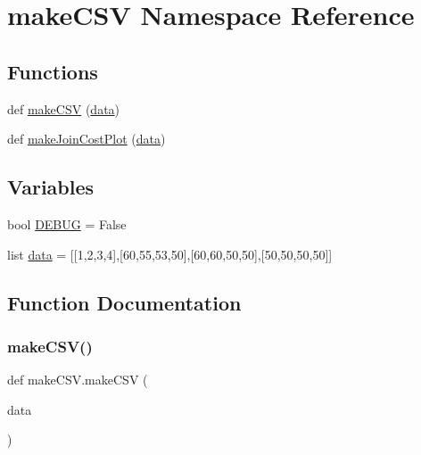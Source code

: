 \hypertarget{namespacemake_c_s_v}{}\section{make\+C\+SV Namespace Reference}
\label{namespacemake_c_s_v}
\subsection*{Functions}
\begin{DoxyCompactItemize}
\item 
def \hyperlink{namespacemake_c_s_v_a2e31859af1f2b66e9bb8e3a5193cd01e}{make\+C\+SV} (\hyperlink{namespacemake_c_s_v_a018aaab493af92ea83348b0db6e32328}{data})
\item 
def \hyperlink{namespacemake_c_s_v_aae06ec5a9c945ceb7cf58ed6874d6ed8}{make\+Join\+Cost\+Plot} (\hyperlink{namespacemake_c_s_v_a018aaab493af92ea83348b0db6e32328}{data})
\end{DoxyCompactItemize}
\subsection*{Variables}
\begin{DoxyCompactItemize}
\item 
bool \hyperlink{namespacemake_c_s_v_a117352cc494cc62c6b2f1882786a332c}{D\+E\+B\+UG} = False
\item 
list \hyperlink{namespacemake_c_s_v_a018aaab493af92ea83348b0db6e32328}{data} = \mbox{[}\mbox{[}1,2,3,4\mbox{]},\mbox{[}60,55,53,50\mbox{]},\mbox{[}60,60,50,50\mbox{]},\mbox{[}50,50,50,50\mbox{]}\mbox{]}
\end{DoxyCompactItemize}


\subsection{Function Documentation}
\mbox{\label{namespacemake_c_s_v_a2e31859af1f2b66e9bb8e3a5193cd01e}} 
\subsubsection{\texorpdfstring{make\+C\+S\+V()}{makeCSV()}}
{\footnotesize\ttfamily def make\+C\+S\+V.\+make\+C\+SV (\begin{DoxyParamCaption}\item[{}]{data }\end{DoxyParamCaption})}


